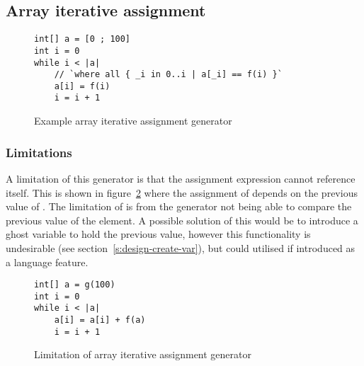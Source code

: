 \subsection{Array iterative assignment}



\begin{figure}
\begin{lstlisting}
int[] a = [0 ; 100]
int i = 0
while i < |a|
	// `where all { _i in 0..i | a[_i] == f(i) }`
	a[i] = f(i)
	i = i + 1
\end{lstlisting}
\caption{Example array iterative assignment generator}
\label{lst:array-iter-assign}
\end{figure}

\subsubsection{Limitations}

A limitation of this generator is that the assignment expression cannot
reference itself.
This is shown in figure~\ref{lst:limit-array-iter-assign} where the assignment
of  depends on the previous value of .
The limitation of is from the generator not being able to compare the previous
value of the element.
A possible solution of this would be to introduce a ghost variable to hold the
previous value, however this functionality is undesirable (see section~\ref{s:design-create-var}),
but could utilised if introduced as a language feature.


\begin{figure}
\begin{lstlisting}
int[] a = g(100)
int i = 0
while i < |a|
	a[i] = a[i] + f(a)
	i = i + 1
\end{lstlisting}
\caption{Limitation of array iterative assignment generator}
\label{lst:limit-array-iter-assign}
\end{figure}
